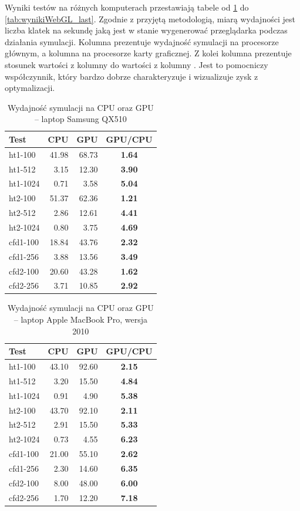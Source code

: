 Wyniki testów na różnych komputerach przestawiają tabele od
\ref{tab:wynikiWebGL_first} do \ref{tab:wynikiWebGL_last}. Zgodnie z przyjętą
metodologią, miarą wydajności jest liczba klatek na sekundę jaką jest w stanie
wygenerować przeglądarka podczas działania symulacji. Kolumna 
prezentuje wydajność symulacji na procesorze głównym, a kolumna  na
procesorze karty graficznej. Z kolei kolumna  prezentuje stosunek
wartości z kolumny  do wartości z kolumny . Jest to pomocniczy
współczynnik, który bardzo dobrze charakteryzuje i wizualizuje zysk z
optymalizacji.

\begin{table}[!htp]
\caption{Wydajność symulacji na CPU oraz GPU -- laptop Samsung QX510}
\centering
\begin{tabular}{|l|r|r|>{\bfseries}c|}
\hline
\cellcolor{t} Test & \cellcolor{cpu} CPU & \cellcolor{gpu} GPU & \cellcolor{gc} GPU/CPU \\ \hline
ht1-100 & 41.98 & 68.73 & 1.64 \\ \hline
ht1-512 & 3.15 & 12.30 & 3.90 \\ \hline
ht1-1024 & 0.71 & 3.58 & 5.04 \\ \hline
ht2-100 & 51.37 & 62.36 & 1.21 \\ \hline
ht2-512 & 2.86 & 12.61 & 4.41 \\ \hline
ht2-1024 & 0.80 & 3.75 & 4.69 \\ \hline
\hline
cfd1-100 & 18.84 & 43.76 & 2.32 \\ \hline
cfd1-256 & 3.88 & 13.56 & 3.49 \\ \hline
cfd2-100 & 20.60 & 43.28 & 1.62 \\ \hline
cfd2-256 & 3.71 & 10.85 & 2.92 \\ \hline
\end{tabular}
\label{tab:wynikiWebGL_first}
\end{table}

\begin{table}[!htp]
\caption{Wydajność symulacji na CPU oraz GPU -- laptop Apple MacBook Pro, 
wersja 2010}
\centering
\begin{tabular}{|l|r|r|>{\bfseries}c|}
\hline
\cellcolor{t} Test & \cellcolor{cpu} CPU & \cellcolor{gpu} GPU & \cellcolor{gc} GPU/CPU \\ \hline
ht1-100 & 43.10 & 92.60 & 2.15 \\ \hline
ht1-512 & 3.20 & 15.50 & 4.84 \\ \hline
ht1-1024 & 0.91 & 4.90 & 5.38 \\ \hline
ht2-100 & 43.70 & 92.10 & 2.11 \\ \hline
ht2-512 & 2.91 & 15.50 & 5.33 \\ \hline
ht2-1024 & 0.73 & 4.55 & 6.23 \\ \hline
\hline
cfd1-100 & 21.00 & 55.10 & 2.62 \\ \hline
cfd1-256 & 2.30 & 14.60 & 6.35 \\ \hline
cfd2-100 & 8.00 & 48.00 & 6.00 \\ \hline
cfd2-256 & 1.70 & 12.20 & 7.18 \\ \hline
\end{tabular}
\label{tab:wynikiWebGL_2}
\end{table}

